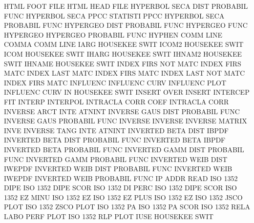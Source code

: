 HTML     FOOT FILE                      HTML     HEAD FILE
HYPERBOL SECA DIST                      PROBABIL FUNC
HYPERBOL SECA PPCC                      STATISTI PPCC
HYPERBOL SECA                           PROBABIL FUNC
HYPERGEO DIST                           PROBABIL FUNC
HYPERGEO FUNC                           HYPERGEO
HYPERGEO                                PROBABIL FUNC
HYPHEN   COMM LINE                      COMMA    COMM LINE
IARG                                    HOUSEKEE SWIT
ICOM2                                   HOUSEKEE SWIT
ICOM                                    HOUSEKEE SWIT
IHARG                                   HOUSEKEE SWIT
IHNAM2                                  HOUSEKEE SWIT
IHNAME                                  HOUSEKEE SWIT
INDEX    FIRS NOT  MATC                 INDEX    FIRS MATC
INDEX    LAST MATC                      INDEX    FIRS MATC
INDEX    LAST NOT  MATC                 INDEX    FIRS MATC
INFLUENC                                INFLUENC CURV
INFLUENC PLOT                           INFLUENC CURV
IN                                      HOUSEKEE SWIT
INSERT   OVER                           INSERT
INTERCEP                                FIT
INTERP                                  INTERPOL
INTRACLA CORR COEF                      INTRACLA CORR
INVERSE  ARCT INTE                      ATNINT
INVERSE  GAUS DIST                      PROBABIL FUNC
INVERSE  GAUS                           PROBABIL FUNC
INVERSE                                 INVERSE
INVERSE                                 MATRIX   INVE
INVERSE  TANG INTE                      ATNINT
INVERTED BETA DIST                      IBPDF
INVERTED BETA DIST                      PROBABIL FUNC
INVERTED BETA                           IBPDF
INVERTED BETA                           PROBABIL FUNC
INVERTED GAMM DIST                      PROBABIL FUNC
INVERTED GAMM                           PROBABIL FUNC
INVERTED WEIB DIST                      IWEPDF
INVERTED WEIB DIST                      PROBABIL FUNC
INVERTED WEIB                           IWEPDF
INVERTED WEIB                           PROBABIL FUNC
IP       ADDR                           READ
ISO      1352 DIPE                      ISO      1352 DIPE SCOR
ISO      1352 DI   PERC                 ISO      1352 DIPE SCOR
ISO      1352 EZ   MINU                 ISO      1352 EZ
ISO      1352 EZ   PLUS                 ISO      1352 EZ
ISO      1352 JSCO PLOT                 ISO      1352 ZSCO PLOT
ISO      1352 PA                        ISO      1352 PA   SCOR
ISO      1352 RELA LABO PERF PLOT       ISO      1352 RLP  PLOT
IUSE                                    HOUSEKEE SWIT
